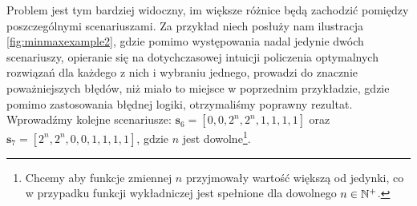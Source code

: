Problem jest tym bardziej widoczny, im większe różnice będą zachodzić pomiędzy poszczególnymi scenariuszami. Za przykład niech posłuży nam ilustracja \ref{fig:minmaxexample2}, gdzie pomimo występowania nadal jedynie dwóch scenariuszy, opieranie się na dotychczasowej intuicji policzenia optymalnych rozwiązań dla każdego z nich i wybraniu jednego, prowadzi do znacznie poważniejszych błędów, niż miało to miejsce w poprzednim przykładzie, gdzie pomimo zastosowania błędnej logiki, otrzymaliśmy poprawny rezultat. Wprowadźmy kolejne scenariusze: $\textbf{s}_{6} = \left[ 0, 0, 2^{n}, 2^{n}, 1, 1, 1, 1 \right]$ oraz $\textbf{s}_{7} = \left[ 2^{n}, 2^{n}, 0, 0, 1, 1, 1, 1 \right]$, gdzie $n$ jest dowolne\footnote{Chcemy aby funkcje zmiennej $n$ przyjmowały wartość większą od jedynki, co w przypadku funkcji wykładniczej jest spełnione dla dowolnego $n \in \mathbb{N}^{+}$.}.

